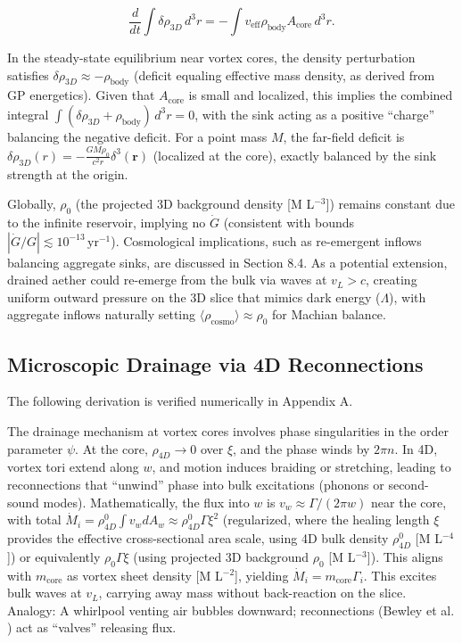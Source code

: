 \[
\frac{d}{dt} \int \delta\rho_{3D} \, d^3 r = - \int v_{\text{eff}} \rho_{\text{body}} A_{\text{core}} \, d^3 r.
\]

In the steady-state equilibrium near vortex cores, the density perturbation satisfies $\delta\rho_{3D} \approx - \rho_{\text{body}}$ (deficit equaling effective mass density, as derived from GP energetics). Given that $A_{\text{core}}$ is small and localized, this implies the combined integral $\int (\delta\rho_{3D} + \rho_{\text{body}}) \, d^3 r = 0$, with the sink acting as a positive ``charge'' balancing the negative deficit. For a point mass $M$, the far-field deficit is $\delta\rho_{3D}(r) = - \frac{G M \rho_0}{c^2 r} \delta^3(\mathbf{r})$ (localized at the core), exactly balanced by the sink strength at the origin.

Globally, $\rho_0$ (the projected 3D background density [M L$^{-3}$]) remains constant due to the infinite reservoir, implying no $\dot{G}$ (consistent with bounds $|\dot{G}/G| \lesssim 10^{-13} \, \mathrm{yr}^{-1}$). Cosmological implications, such as re-emergent inflows balancing aggregate sinks, are discussed in Section 8.4. As a potential extension, drained aether could re-emerge from the bulk via waves at $v_L > c$, creating uniform outward pressure on the 3D slice that mimics dark energy ($\Lambda$), with aggregate inflows naturally setting $\langle \rho_{\text{cosmo}} \rangle \approx \rho_0$ for Machian balance.

\subsection{Microscopic Drainage via 4D Reconnections}

The following derivation is verified numerically in Appendix A.

The drainage mechanism at vortex cores involves phase singularities in the order parameter $\psi$. At the core, $\rho_{4D} \to 0$ over $\xi$, and the phase winds by $2\pi n$. In 4D, vortex tori extend along $w$, and motion induces braiding or stretching, leading to reconnections that ``unwind'' phase into bulk excitations (phonons or second-sound modes). Mathematically, the flux into $w$ is $v_w \approx \Gamma / (2\pi w)$ near the core, with total $\dot{M}_i = \rho_{4D}^0 \int v_w dA_w \approx \rho_{4D}^0 \Gamma \xi^2$ (regularized, where the healing length $\xi$ provides the effective cross-sectional area scale, using 4D bulk density $\rho_{4D}^0$ [M L$^{-4}$]) or equivalently $\rho_0 \Gamma \xi$ (using projected 3D background $\rho_0$ [M L$^{-3}$]). This aligns with $m_{\text{core}}$ as vortex sheet density [M L$^{-2}$], yielding $\dot{M}_i = m_{\text{core}} \Gamma_i$. This excites bulk waves at $v_L$, carrying away mass without back-reaction on the slice. Analogy: A whirlpool venting air bubbles downward; reconnections (Bewley et al. \cite{bewley2008characterization}) act as ``valves'' releasing flux.

